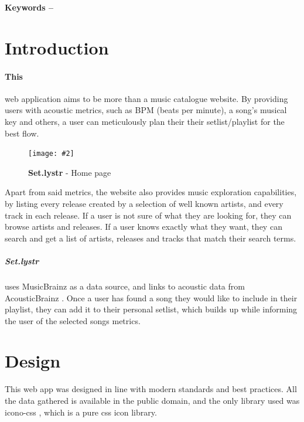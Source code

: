 \documentclass[10pt, a4paper]{article}
\title{\mytitle}
\author{\myauthor\hspace{1em}\\\contact\\Edinburgh Napier University\hspace{0.5em}-\hspace{0.5em}\mymodule}
\date{}
\newcommand{\figuremacro}[5]{
    \begin{figure}[#1]
        \centering
        \texttt{[image: \#2]}
        \caption[#3]{\textbf{#3}#4}
        \label{fig:#2}
    \end{figure}
}
\begin{document}
    \maketitle
    \begin{abstract}
        Set.lystr is a music catalogue exploration/playlist creation tool geared towards musicians who play cover songs. Set.lystr allows its users to search and compare songs and build the ultimate playlist.
    \end{abstract}
    
    \textbf{Keywords -- }{\mykeywords}
    
    \section{Introduction}
    \paragraph{This} web application aims to be more than a music catalogue website. By providing users with acoustic metrics, such as BPM (beats per minute), a song's musical key and others, a user can meticulously plan their their setlist/playlist for the best flow.
    
    \figuremacro{h}{index}{Set.lystr}{ - Home page}{1.0}
    
	Apart from said metrics, the website also provides music exploration capabilities, by listing every release created by a selection of well known artists, and every track in each release.
    If a user is not sure of what they are looking for, they can browse artists and releases. If a user knows exactly what they want, they can search and get a list of artists, releases and tracks that match their search terms.
	\subparagraph{Set.lystr} uses MusicBrainz \cite{journals/expert/Swartz02} as a data source, and links to acoustic data from AcousticBrainz  \cite{conf/ismir/PorterBKTS15}.
	Once a user has found a song they would like to include in their playlist, they can add it to their personal setlist, which builds up while informing the user of the selected songs metrics.
	
	\section{Design}
	This web app was designed in line with modern standards and best practices. All the data gathered is available in the public domain, and the only library used was icono-css \cite{Alipoor}, which is a pure css icon library.
    
\end{document}
